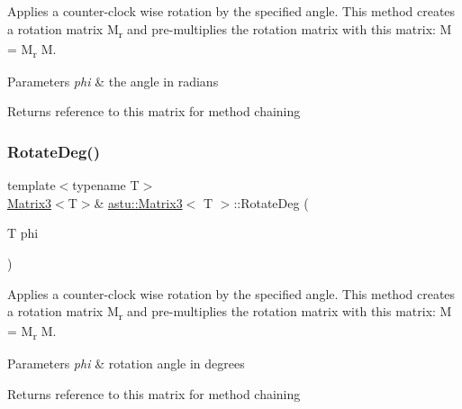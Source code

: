 Applies a counter-\/clock wise rotation by the specified angle. This method creates a rotation matrix M\textsubscript{r} and pre-\/multiplies the rotation matrix with this matrix\+: M = M\textsubscript{r} \textperiodcentered{} M.


\begin{DoxyParams}{Parameters}
{\em phi} & the angle in radians \\
\hline
\end{DoxyParams}
\begin{DoxyReturn}{Returns}
reference to this matrix for method chaining 
\end{DoxyReturn}
\mbox{\label{classastu_1_1Matrix3_aa621d700116ea799d236edf376586fb0}} 
\subsubsection{\texorpdfstring{Rotate\+Deg()}{RotateDeg()}}
{\footnotesize\ttfamily template$<$typename T$>$ \\
\hyperlink{classastu_1_1Matrix3}{Matrix3}$<$T$>$\& \hyperlink{classastu_1_1Matrix3}{astu\+::\+Matrix3}$<$ T $>$\+::Rotate\+Deg (\begin{DoxyParamCaption}\item[{T}]{phi }\end{DoxyParamCaption})\hspace{0.3cm}{\ttfamily [inline]}}

Applies a counter-\/clock wise rotation by the specified angle. This method creates a rotation matrix M\textsubscript{r} and pre-\/multiplies the rotation matrix with this matrix\+: M = M\textsubscript{r} \textperiodcentered{} M.


\begin{DoxyParams}{Parameters}
{\em phi} & rotation angle in degrees \\
\hline
\end{DoxyParams}
\begin{DoxyReturn}{Returns}
reference to this matrix for method chaining 
\end{DoxyReturn}
\mbox{\label{classastu_1_1Matrix3_aaf8d53bb087155b957c360692a08a441}} 
